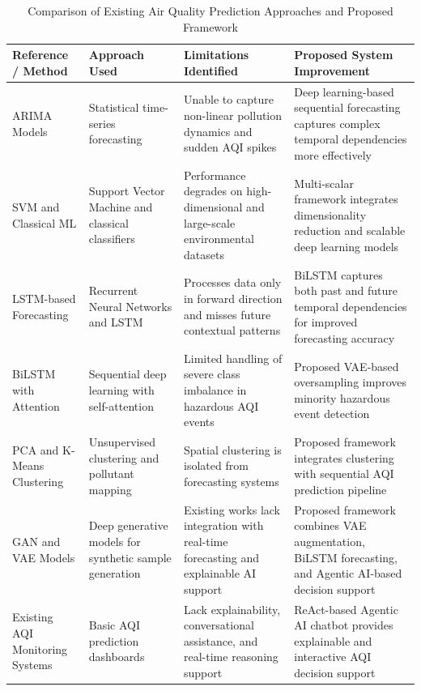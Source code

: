 \documentclass[conference]{IEEEtran}
\begin{document}
\begin{table}[ht]
\centering
\caption{Comparison of Existing Air Quality Prediction Approaches and Proposed Framework}
\label{tab:researchgap}
\renewcommand{\arraystretch}{1.3}
\begin{tabular}{|p{2.8cm}|p{4.2cm}|p{4.5cm}|p{4.5cm}|}
\hline
\textbf{Reference / Method} & \textbf{Approach Used} & \textbf{Limitations Identified} & \textbf{Proposed System Improvement} \\
\hline

ARIMA Models \cite{zhang} & Statistical time-series forecasting & Unable to capture non-linear pollution dynamics and sudden AQI spikes & Deep learning-based sequential forecasting captures complex temporal dependencies more effectively \\
\hline

SVM and Classical ML \cite{kumar,patel} & Support Vector Machine and classical classifiers & Performance degrades on high-dimensional and large-scale environmental datasets & Multi-scalar framework integrates dimensionality reduction and scalable deep learning models \\
\hline

LSTM-based Forecasting \cite{sharma} & Recurrent Neural Networks and LSTM & Processes data only in forward direction and misses future contextual patterns & BiLSTM captures both past and future temporal dependencies for improved forecasting accuracy \\
\hline

BiLSTM with Attention \cite{rao,li} & Sequential deep learning with self-attention & Limited handling of severe class imbalance in hazardous AQI events & Proposed VAE-based oversampling improves minority hazardous event detection \\
\hline

PCA and K-Means Clustering \cite{singh} & Unsupervised clustering and pollutant mapping & Spatial clustering is isolated from forecasting systems & Proposed framework integrates clustering with sequential AQI prediction pipeline \\
\hline

GAN and VAE Models \cite{goodfellow,kingma} & Deep generative models for synthetic sample generation & Existing works lack integration with real-time forecasting and explainable AI support & Proposed framework combines VAE augmentation, BiLSTM forecasting, and Agentic AI-based decision support \\
\hline

Existing AQI Monitoring Systems & Basic AQI prediction dashboards & Lack explainability, conversational assistance, and real-time reasoning support & ReAct-based Agentic AI chatbot provides explainable and interactive AQI decision support \\
\hline

\end{tabular}
\end{table}
\end{document}
